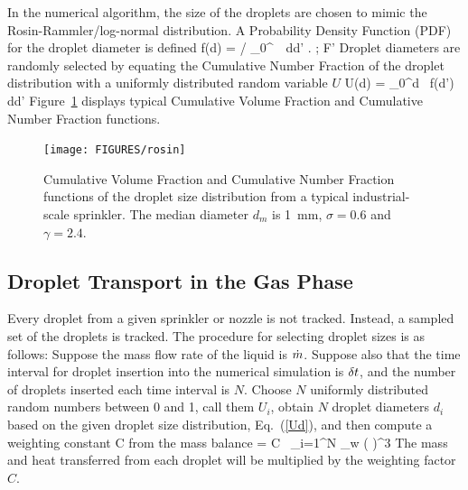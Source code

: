\documentclass[11pt]{book}
\begin{document}
In the numerical algorithm,
the size of the droplets are chosen to mimic the
Rosin-Rammler/log-normal distribution. A Probability Density Function (PDF)
for the droplet diameter is defined
\be f(d) =   \left/ \int_0^\infty \, 
     \, \mbox{d}d' \right. \quad ; \quad F' \equiv {}   \ee
Droplet diameters are randomly selected by equating the Cumulative
Number Fraction of the droplet distribution with a uniformly
distributed random variable $U$
\be U(d) = \int_0^d \, f(d') \, \mbox{d}d'  \label{Ud}  \ee
Figure~\ref{rosin} displays typical Cumulative Volume Fraction and
Cumulative Number Fraction functions.
\begin{figure}[t]
\texttt{[image: FIGURES/rosin]}
\caption{Cumulative Volume Fraction and Cumulative Number
Fraction functions of the droplet size distribution from
a typical industrial-scale sprinkler. The median diameter $d_m$ is
1~mm, $\sigma=0.6$ and $\gamma=2.4$.}
\label{rosin}
\end{figure}



\subsection{Droplet Transport in the Gas Phase}

Every droplet from a given sprinkler or nozzle is not tracked. Instead,
a sampled set of the droplets is tracked.
The procedure for selecting droplet sizes is as follows:
Suppose the mass flow rate of the liquid is $\dot{m}$.
Suppose also that the time interval for droplet insertion
into the numerical simulation is $\delta t$, and the number of droplets
inserted each time interval is $N$. Choose $N$ uniformly distributed random
numbers between 0 and 1, call them $U_i$,
obtain $N$ droplet diameters $d_i$ based on the
given droplet size distribution, Eq.~(\ref{Ud}), and then compute
a weighting constant C from the mass balance
\be \dm \; \dt = C \, \sum_{i=1}^N \;   \pi \rho_w
      \left(  \right)^3 \ee
The mass and heat transferred from each droplet will be multiplied by
the weighting factor $C$.
\end{document}
